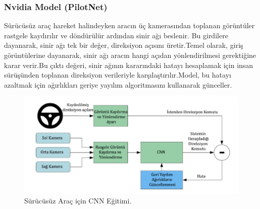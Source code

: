 \documentclass{article}
\begin{document}
\subsubsection{Nvidia Model (PilotNet)}
Sürücüsüz araç hareket halindeyken aracın üç kamerasından toplanan görüntüler rastgele kaydırılır ve döndürülür ardından sinir ağı beslenir. Bu girdilere dayanarak, sinir ağı tek bir değer, direksiyon açısını üretir.Temel olarak, giriş görüntülerine dayanarak, sinir ağı aracın hangi açıdan yönlendirilmesi gerektiğine karar verir.Bu çıktı değeri, sinir ağının kararındaki hatayı hesaplamak için insan sürüşünden toplanan direksiyon verileriyle karşılaştırılır.Model, bu hatayı azaltmak için ağırlıkları geriye yayılım algoritmasını kullanarak günceller.
\begin{figure}[h]
  \centering
  \includegraphics[width=1\textwidth]{image/Resim66.PNG} %
\caption{Sürücüsüz Araç için CNN Eğitimi\cite{bojarski2016end}.}
  \label{fig:cnnmimari}  
\end{figure}
\newpage
\end{document}
